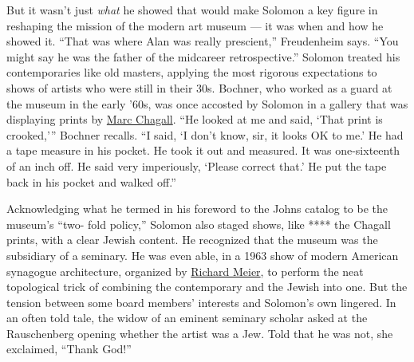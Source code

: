 But it wasn't just \emph{what} he showed that would make Solomon a key
figure in reshaping the mission of the modern art museum --- it was when
and how he showed it. ``That was where Alan was really prescient,''
Freudenheim says. ``You might say he was the father of the midcareer
retrospective.'' Solomon treated his contemporaries like old masters,
applying the most rigorous expectations to shows of artists who were
still in their 30s. Bochner, who worked as a guard at the museum in the
early '60s, was once accosted by Solomon in a gallery that was
displaying prints by
\href{https://www.nytimes3xbfgragh.onion/topic/person/marc-chagall}{Marc
Chagall}. ``He looked at me and said, `That print is crooked,''' Bochner
recalls. ``I said, `I don't know, sir, it looks OK to me.' He had a tape
measure in his pocket. He took it out and measured. It was one-sixteenth
of an inch off. He said very imperiously, `Please correct that.' He put
the tape back in his pocket and walked off.''

Acknowledging what he termed in his foreword to the Johns catalog to be
the museum's ``two- fold policy,'' Solomon also staged shows, like ****
the Chagall prints, with a clear Jewish content. He recognized that the
museum was the subsidiary of a seminary. He was even able, in a 1963
show of modern American synagogue architecture, organized by
\href{https://www.nytimes3xbfgragh.onion/topic/person/richard-meier}{Richard
Meier}, to perform the neat topological trick of combining the
contemporary and the Jewish into one. But the tension between some board
members' interests and Solomon's own lingered. In an often told tale,
the widow of an eminent seminary scholar asked at the Rauschenberg
opening whether the artist was a Jew. Told that he was not, she
exclaimed, ``Thank God!''

